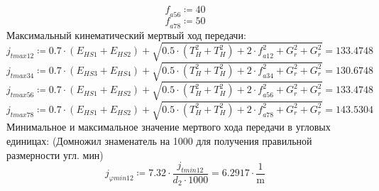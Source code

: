 \documentclass{article}
\newcommand{\defeq}{\coloneq} %
\begin{document}
\begin{equation*}
\textit{f}_{\textit{a56}} \defeq 40
\end{equation*}
\begin{equation*}
\textit{f}_{\textit{a78}} \defeq 50
\end{equation*}
\colorbox[HTML]{000000}{Максимальный кинематический мертвый ход передачи:}\newline
\begin{equation*}
\textit{j}_{\textit{tmax12}} \defeq 0.7 \cdot \left( \textit{E}_{\textit{HS1}}+\textit{E}_{\textit{HS2}} \right)+\sqrt{0.5 \cdot \left( T_{H}^{2}+T_{H}^{2} \right)+2 \cdot \textit{f}_{\textit{a12}}^{2}+G_{r}^{2}+G_{r}^{2}} = {133.4748}
\end{equation*}
\begin{equation*}
\textit{j}_{\textit{tmax34}} \defeq 0.7 \cdot \left( \textit{E}_{\textit{HS3}}+\textit{E}_{\textit{HS4}} \right)+\sqrt{0.5 \cdot \left( T_{H}^{2}+T_{H}^{2} \right)+2 \cdot \textit{f}_{\textit{a34}}^{2}+G_{r}^{2}+G_{r}^{2}} = {130.6748}
\end{equation*}
\begin{equation*}
\textit{j}_{\textit{tmax56}} \defeq 0.7 \cdot \left( \textit{E}_{\textit{HS1}}+\textit{E}_{\textit{HS2}} \right)+\sqrt{0.5 \cdot \left( T_{H}^{2}+T_{H}^{2} \right)+2 \cdot \textit{f}_{\textit{a56}}^{2}+G_{r}^{2}+G_{r}^{2}} = {133.4748}
\end{equation*}
\begin{equation*}
\textit{j}_{\textit{tmax78}} \defeq 0.7 \cdot \left( \textit{E}_{\textit{HS1}}+\textit{E}_{\textit{HS2}} \right)+\sqrt{0.5 \cdot \left( T_{H}^{2}+T_{H}^{2} \right)+2 \cdot \textit{f}_{\textit{a78}}^{2}+G_{r}^{2}+G_{r}^{2}} = {143.5304}
\end{equation*}
\colorbox[HTML]{000000}{Минимальное и максимальное значение мертвого хода передачи в угловых единицах:}\newline
\colorbox[HTML]{000000}{(Домножил знаменатель на 1000 для получения правильной размерности угл. мин)}\newline
\begin{equation*}
\textit{j}_{\textit{φmin12}} \defeq 7.32 \cdot \frac{\textit{j}_{\textit{tmin12}}}{\textit{d}_{\textit{2}} \cdot 1000} = {6.2917 \cdot \frac{1}{\mathrm{m}}}
\end{equation*}
\end{document}
